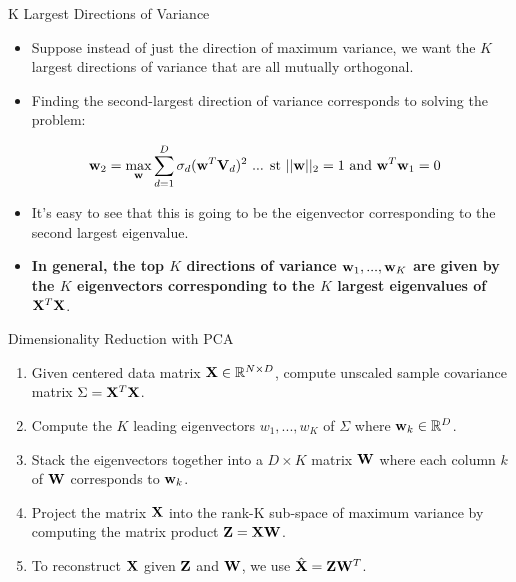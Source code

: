 \documentclass[serif,xcolor=pdftex,dvipsnames,table,hyperref={bookmarks=false,breaklinks}]{beamer}
\begin{document}
\begin{frame}[t]{K Largest Directions of Variance}

\begin{itemize}

\item Suppose instead of just the direction of maximum variance, we want the 
$K$ largest directions of variance that are all mutually orthogonal.

\pause \item Finding the second-largest direction of variance corresponds to 
solving the problem:

\begin{align*}
{\mathbf{w}}_2 &=  \max_{{\mathbf{w}}} \sum_{d=1}^D \sigma_d 
({\mathbf{w}}^T{\mathbf{V}}_d)^2 \mbox{ ... st } 
||{\mathbf{w}}||_2=1 \mbox { and } {\mathbf{w}}^T{\mathbf{w}}_1=0
\end{align*}

\pause\item It's easy to see that this is going 
to be the eigenvector corresponding to the second largest eigenvalue.

\pause\item \textbf{In general, the top $K$ directions of variance 
${\mathbf{w}}_1,...,{\mathbf{w}}_K$ are given by the $K$ eigenvectors corresponding to 
the $K$ largest eigenvalues of ${\mathbf{X}}^T{\mathbf{X}}$}.

\end{itemize} 
\end{frame}

\begin{frame}[t]{Dimensionality Reduction with PCA}

\begin{enumerate}
\item Given centered data matrix ${\mathbf{X}} \in \mathbb{R}^{N\times D}$, compute 
unscaled sample covariance matrix $\Sigma = {\mathbf{X}}^T{\mathbf{X}}$.

\pause\item Compute the $K$ leading eigenvectors $w_1,...,w_K$ of $\Sigma$ 
where ${\mathbf{w}}_k \in \mathbb{R}^D$.

\pause\item Stack the eigenvectors together into a $D \times K$ matrix 
${\mathbf{W}}$ where each column $k$ of ${\mathbf{W}}$ corresponds to ${\mathbf{w}}_k$.

\pause\item Project the matrix ${\mathbf{X}}$ into the rank-K sub-space of maximum 
variance by computing the matrix product ${\mathbf{Z}}={\mathbf{X}}{\mathbf{W}}$.

\pause\item To reconstruct ${\mathbf{X}}$ given ${\mathbf{Z}}$ and ${\mathbf{W}}$,
we use $\hat{{\mathbf{X}}} = {\mathbf{Z}}{\mathbf{W}}^T$.

\end{enumerate} 
\end{frame}
\end{document}

